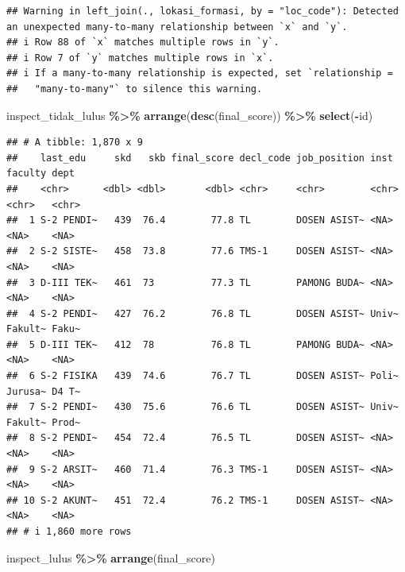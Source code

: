 \documentclass[
]{article}
\newenvironment{Shaded}{\begin{snugshade}}{\end{snugshade}}
\newcommand{\FunctionTok}[1]{\textcolor[rgb]{0.13,0.29,0.53}{\textbf{#1}}}
\newcommand{\NormalTok}[1]{#1}
\newcommand{\SpecialCharTok}[1]{\textcolor[rgb]{0.81,0.36,0.00}{\textbf{#1}}}
\begin{document}
\begin{verbatim}
## Warning in left_join(., lokasi_formasi, by = "loc_code"): Detected an unexpected many-to-many relationship between `x` and `y`.
## i Row 88 of `x` matches multiple rows in `y`.
## i Row 7 of `y` matches multiple rows in `x`.
## i If a many-to-many relationship is expected, set `relationship =
##   "many-to-many"` to silence this warning.
\end{verbatim}

\begin{Shaded}
\begin{Highlighting}[]
\NormalTok{inspect\_tidak\_lulus }\SpecialCharTok{\%\textgreater{}\%} 
  \FunctionTok{arrange}\NormalTok{(}\FunctionTok{desc}\NormalTok{(final\_score)) }\SpecialCharTok{\%\textgreater{}\%} 
  \FunctionTok{select}\NormalTok{(}\SpecialCharTok{{-}}\NormalTok{id)}
\end{Highlighting}
\end{Shaded}

\begin{verbatim}
## # A tibble: 1,870 x 9
##    last_edu     skd   skb final_score decl_code job_position inst  faculty dept 
##    <chr>      <dbl> <dbl>       <dbl> <chr>     <chr>        <chr> <chr>   <chr>
##  1 S-2 PENDI~   439  76.4        77.8 TL        DOSEN ASIST~ <NA>  <NA>    <NA> 
##  2 S-2 SISTE~   458  73.8        77.6 TMS-1     DOSEN ASIST~ <NA>  <NA>    <NA> 
##  3 D-III TEK~   461  73          77.3 TL        PAMONG BUDA~ <NA>  <NA>    <NA> 
##  4 S-2 PENDI~   427  76.2        76.8 TL        DOSEN ASIST~ Univ~ Fakult~ Faku~
##  5 D-III TEK~   412  78          76.8 TL        PAMONG BUDA~ <NA>  <NA>    <NA> 
##  6 S-2 FISIKA   439  74.6        76.7 TL        DOSEN ASIST~ Poli~ Jurusa~ D4 T~
##  7 S-2 PENDI~   430  75.6        76.6 TL        DOSEN ASIST~ Univ~ Fakult~ Prod~
##  8 S-2 PENDI~   454  72.4        76.5 TL        DOSEN ASIST~ <NA>  <NA>    <NA> 
##  9 S-2 ARSIT~   460  71.4        76.3 TMS-1     DOSEN ASIST~ <NA>  <NA>    <NA> 
## 10 S-2 AKUNT~   451  72.4        76.2 TMS-1     DOSEN ASIST~ <NA>  <NA>    <NA> 
## # i 1,860 more rows
\end{verbatim}

\begin{Shaded}
\begin{Highlighting}[]
\NormalTok{inspect\_lulus }\SpecialCharTok{\%\textgreater{}\%} 
  \FunctionTok{arrange}\NormalTok{(final\_score)}
\end{Highlighting}
\end{Shaded}
\end{document}
